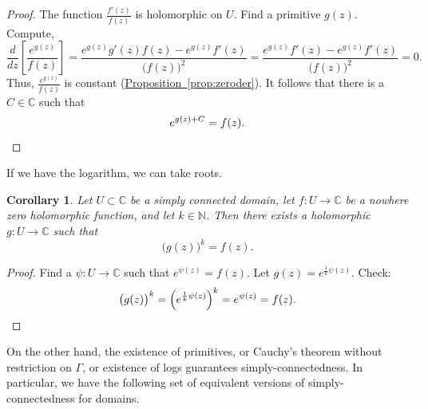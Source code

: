 \documentclass[12pt,openany]{book}
\newcommand{\C}{{\mathbb{C}}}
\newcommand{\N}{{\mathbb{N}}}
\theoremstyle{plain}
\newtheorem{cor}[thm]{Corollary}
\theoremstyle{remark}
\theoremstyle{definition}
\theoremstyle{exercise}
\theoremstyle{example}
\newcommand{\propref}[1]{\hyperref[#1]{Proposition~\ref*{#1}}}
\begin{document}
\begin{proof}
The function $\frac{f'(z)}{f(z)}$ is holomorphic on $U$.
Find a primitive $g(z)$.  Compute,
\begin{equation*}
\frac{d}{dz} \left[ \frac{e^{g(z)}}{f(z)} \right] =
\frac{ e^{g(z)} g'(z) f(z) - e^{g(z)} f'(z) }{{\bigl(f(z)\bigr)}^2}
=
\frac{ e^{g(z)} f'(z) - e^{g(z)} f'(z) }{{\bigl(f(z)\bigr)}^2}
=
0 .
\end{equation*}
Thus, $\frac{e^{g(z)}}{f(z)}$ is constant
(\propref{prop:zeroder}).  It follows that
there is a $C \in \C$ such that
\begin{equation*}
e^{g(z) + C} = f(z) .
\qedhere
\end{equation*}
\end{proof}

If we have the logarithm, we can take roots.

\begin{cor}
Let $U \subset \C$ be a simply connected domain,
let $f \colon U \to \C$ be a nowhere zero holomorphic
function, and let $k \in \N$.
Then there exists a holomorphic $g \colon U \to \C$
such that
\begin{equation*}
{\bigl(g(z)\bigr)}^k = f(z) .
\end{equation*}
\end{cor}

\begin{proof}
Find a $\psi \colon U \to \C$ such that $e^{\psi(z)} = f(z)$.  Let
$g(z) = e^{\frac{1}{k} \psi(z)}$.  Check:
\begin{equation*}
{\bigl(g(z)\bigr)}^k
=
{\left( e^{\frac{1}{k} \psi(z)} \right)}^k
=
e^{\psi(z)} = f(z) . \qedhere
\end{equation*}
\end{proof}

On the other hand, the existence of primitives, or
Cauchy's theorem without restriction on $\Gamma$, or existence of logs guarantees
simply-connectedness.  In particular, we have the following set of equivalent
versions of simply-connectedness for domains.
\end{document}
